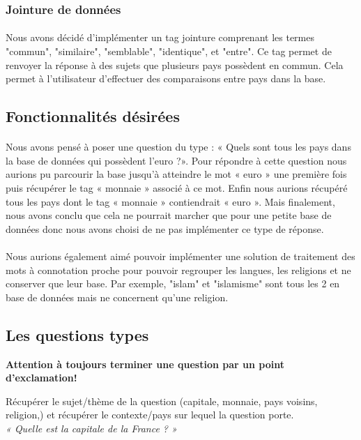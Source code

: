 \documentclass[11pt,a4paper]{article}
\begin{document}
\subsubsection{Jointure de données}
\paragraph{}Nous avons décidé d'implémenter un tag jointure comprenant les termes "commun", "similaire", "semblable", "identique", et "entre". Ce tag permet de renvoyer la réponse à des sujets que plusieurs pays possèdent en commun. Cela permet à l'utilisateur d'effectuer des comparaisons entre pays dans la base.

\subsection{Fonctionnalités désirées}

\paragraph{}Nous avons pensé à poser une question du type : «  Quels sont tous les pays dans la base de données qui possèdent l’euro ?». Pour répondre à cette question nous aurions pu parcourir la base jusqu'à atteindre le mot « euro » une première fois puis  récupérer le tag « monnaie » associé à ce mot. Enfin nous aurions récupéré tous les pays dont le tag « monnaie » contiendrait « euro ». Mais finalement, nous avons conclu que cela ne pourrait marcher que pour une petite base de données donc nous avons choisi de ne pas implémenter ce type de réponse. 
\paragraph{}Nous aurions également aimé pouvoir implémenter une solution de traitement des mots à connotation proche pour pouvoir regrouper les langues, les religions et ne conserver que leur base. Par exemple, "islam" et "islamisme" sont tous les 2 en base de données mais ne concernent qu'une religion.

\subsection{Les questions types}

\textbf{Attention à toujours terminer une question par un point d'exclamation!}


Récupérer le sujet/thème de la question (capitale, monnaie, pays voisins, religion,) et récupérer le contexte/pays sur lequel la question porte. \\
\textit{« Quelle est la capitale de la France ? » }
\end{document}
